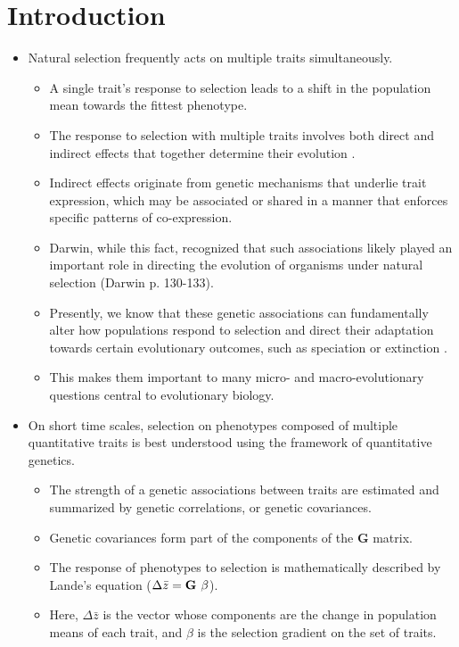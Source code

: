 \documentclass[11pt,one column]{article}
\begin{document}
\section*{Introduction}
\begin{itemize}
\item Natural selection frequently acts on multiple traits simultaneously. 
	\begin{itemize}
	\item A single trait’s response to selection leads to a shift in the population mean towards the fittest phenotype.
	\item The response to selection with multiple traits involves both direct and indirect effects that together determine their evolution \cite{Scarcelli23102007,Lovell2013,Wagner2011}.  
	\item Indirect effects originate from genetic mechanisms that underlie trait expression, which may be associated or shared in a manner that enforces specific patterns of co-expression.
	\item Darwin, while this fact, recognized that such associations likely played an important role in directing the evolution of organisms under natural selection (Darwin p. 130-133).
	\item Presently, we know that these genetic associations can fundamentally alter how populations respond to selection and direct their adaptation towards certain evolutionary outcomes, such as speciation or extinction \cite{Felsenstein1979, Arnold2001, Arnold2008}.
	\item This makes them important to many micro- and macro-evolutionary questions central to evolutionary biology.
	\end{itemize}
\item On short time scales, selection on phenotypes composed of multiple quantitative traits is best understood using the framework of quantitative genetics. 
	\begin{itemize}	
	\item The strength of a genetic associations between traits are estimated and summarized by genetic correlations, or genetic covariances.
	\item Genetic covariances form part of the components of the \textbf{G} matrix.
	\item The response of phenotypes to selection is mathematically described by Lande's equation ($\Delta \bar{z} = \textbf{G} \hspace{.05in}\beta$).
	\item Here, $\Delta \bar{z}$ is the vector whose components are the change in population means of each trait, and $\beta$ is the selection gradient on the set of traits. 

\end{itemize}
\end{itemize}
\end{document}
